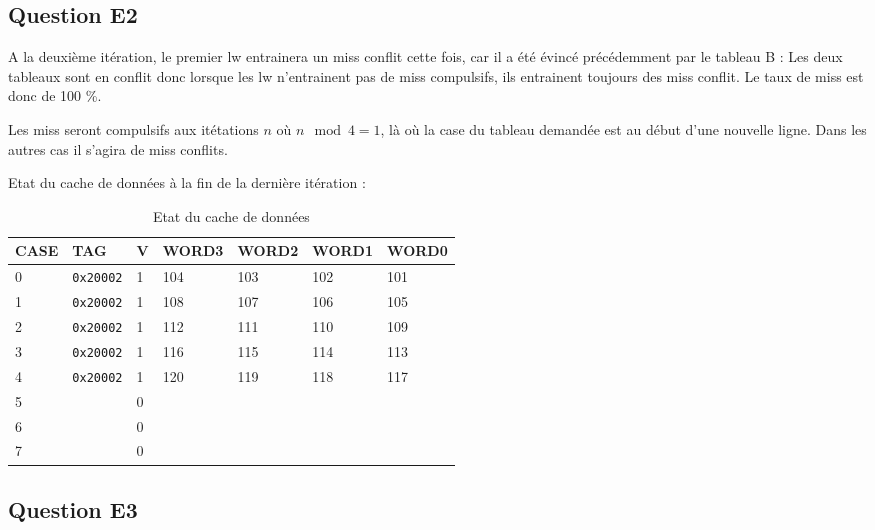 \documentclass{article}
\begin{document}
\subsection{Question E2}

A la deuxième itération, le premier lw entrainera un miss conflit cette fois,
car il a été évincé précédemment par le tableau B : Les deux tableaux sont
en conflit donc lorsque les lw n'entrainent pas de miss compulsifs, ils
entrainent toujours des miss conflit. Le taux de miss est donc de 100 \%.

Les miss seront compulsifs aux itétations $n$ où $n \mod 4 = 1$, là où la case du
tableau demandée est au début d'une nouvelle ligne.
Dans les autres cas il s'agira de miss conflits.

Etat du cache de données à la fin de la dernière itération :
\begin{table}[H]
\centering
\begingroup
\setlength{\tabcolsep}{5pt}
\renewcommand{\arraystretch}{1.1}
\begin{tabular}{| l | l | l | l | l | l | l |}

\hline
CASE & TAG & V & WORD3 & WORD2 & WORD1 & WORD0 \\
\hline
0 &\texttt{0x20002} & 1 & 104 & 103 & 102 & 101 \\ 
\hline
1 &\texttt{0x20002} & 1 & 108 & 107 & 106 & 105 \\ 
\hline
2 &\texttt{0x20002} & 1 & 112 & 111 & 110 & 109 \\ 
\hline
3 &\texttt{0x20002} & 1 & 116 & 115 & 114 & 113 \\ 
\hline
4 &\texttt{0x20002} & 1 & 120 & 119 & 118 & 117 \\ 
\hline
5&&0&&&& \\
\hline
6&&0&&&& \\
\hline
7&&0&&&& \\
\hline
\end{tabular}
\caption{Etat du cache de données}
\endgroup
\end{table}


\subsection{Question E3}
\end{document}
